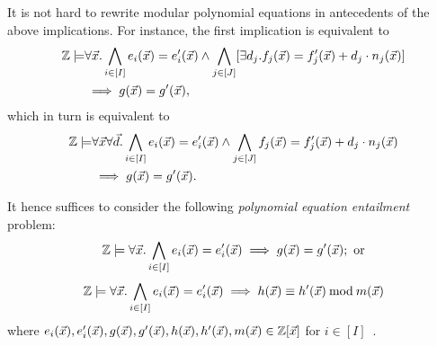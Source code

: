 It is not hard to rewrite modular polynomial equations in antecedents
of the above implications. For instance, the first implication is
equivalent to
\begin{equation*}
\begin{aligned}
\bbfZ \models & \forall \vx. %
\bigwedge\limits_{i \in [I]} e_i (\vx) = e'_i (\vx) \wedge
\bigwedge\limits_{j \in [J]} [\exists d_j. f_j (\vx) = f'_j (\vx) + d_j \cdot n_j (\vx)] \\
& \implies
g (\vx) = g' (\vx),
\end{aligned}
\end{equation*}
which in turn is equivalent to
\begin{equation*}
\begin{aligned}
\bbfZ \models & \forall \vx \forall \vd. %
\bigwedge\limits_{i \in [I]} e_i (\vx) = e'_i (\vx) \wedge
\bigwedge\limits_{j \in [J]} f_j (\vx) = f'_j (\vx) + d_j \cdot n_j (\vx) \\
& \implies
g (\vx) = g' (\vx).
\end{aligned}
\end{equation*}

It hence suffices to consider the following
\emph{polynomial equation entailment} problem:
\vspace{-.5em}
\begin{equation}
  \label{eq:reduced-polynomial-equation-implicant}
  \bbfZ \models \forall \vx. %
  \bigwedge\limits_{i \in [I]} e_i (\vx) = e'_i (\vx)
  \implies
  g (\vx) = g' (\vx); \textmd{ or}
\end{equation}
\vspace{-.5em}
 \begin{equation}
   \label{eq:reduced-modular-polynomial-equation-implicant}
   \bbfZ \models \forall \vx. %
   \bigwedge\limits_{i \in [I]} e_i (\vx) = e'_i (\vx)
   \implies
   h (\vx) \equiv h' (\vx) \mod m (\vx)
\vspace{-.5em}
 \end{equation}
 where $e_i (\vec{x}), e'_i (\vec{x}), g (\vec{x}), g' (\vec{x}), h (\vec{x}), h' (\vec{x}), m (\vec{x})
 \in \mathbb{Z}[\vec{x}]$ for $i \in [I]$~\cite{H:07:AENTP}.

